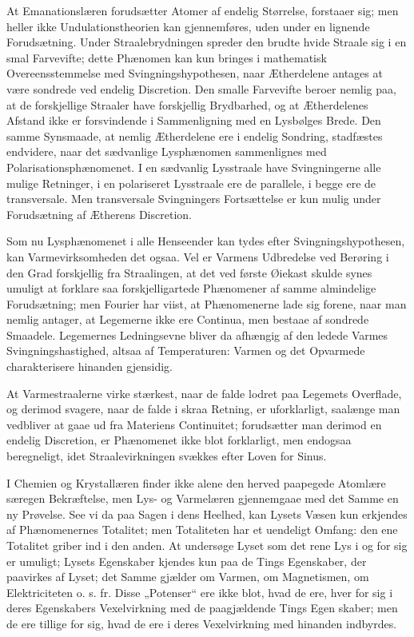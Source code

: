 \documentclass[12pt]{book}
\newcommand{\opage}[1]{\marginnote{\footnotesize\textit{[#1]}}}
\begin{document}
At Emanationslæren forudsætter Atomer af endelig Størrelse, forstaaer sig; men heller
ikke Undulationstheorien kan gjennemføres, uden under en lignende Forudsætning. Under
Straalebrydningen spreder den brudte hvide Straale sig i en smal Farvevifte; dette
Phænomen kan kun bringes i mathematisk Overeensstemmelse med Svingningshypothesen, naar
Ætherdelene antages at være sondrede ved endelig Discretion. Den smalle Farvevifte
beroer nemlig paa, at de forskjellige Straaler have forskjellig Brydbarhed, og at
Ætherdelenes Afstand ikke er forsvindende i Sammenligning med en Lysbølges Brede. Den
samme Synsmaade, at nemlig Ætherdelene ere i endelig Sondring, stadfæstes endvidere,
naar det sædvanlige Lysphænomen sammenlignes med Polarisationsphænomenet. I en
sædvanlig Lysstraale have
\opage{65} Svingningerne alle mulige Retninger, i en polariseret Lysstraale ere de parallele, i
begge ere de transversale. Men transversale Svingningers Fortsættelse er kun mulig
under Forudsætning af Ætherens Discretion.

Som nu Lysphænomenet i alle Henseender kan tydes efter Svingningshypothesen, kan
Varmevirksomheden det ogsaa. Vel er Varmens Udbredelse ved Berøring i den Grad
forskjellig fra Straalingen, at det ved første Øiekast skulde synes umuligt at forklare
saa forskjelligartede Phænomener af samme almindelige Forudsætning; men Fourier har
viist, at Phænomenerne lade sig forene, naar man nemlig antager, at Legemerne ikke ere
Continua, men bestaae af sondrede Smaadele. Legemernes Ledningsevne bliver da afhængig
af den ledede Varmes Svingningshastighed, altsaa af Temperaturen: Varmen og det
Opvarmede charakterisere hinanden gjensidig.

At Varmestraalerne virke stærkest, naar de falde lodret paa Legemets Overflade, og
derimod svagere, naar de falde i skraa Retning, er uforklarligt, saalænge man vedbliver
at gaae ud fra Materiens Continuitet; forudsætter man derimod en endelig Discretion, er
Phænomenet ikke blot forklarligt, men endogsaa beregneligt, idet Straalevirkningen
svækkes efter Loven for Sinus.

I Chemien og Krystallæren finder ikke alene den herved paapegede Atomlære særegen
Bekræftelse, men Lys- og Varmelæren gjennemgaae med det Samme en ny Prøvelse. See vi da
paa Sagen i dens Heelhed, kan Lysets Væsen kun erkjendes af Phænomenernes Totalitet;
men Totaliteten har et uendeligt Omfang: den ene Totalitet griber ind i den anden. At
undersøge Lyset som det rene Lys i og for sig er umuligt; Lysets Egenskaber kjendes kun
paa de Tings Egenskaber, der paavirkes af Lyset; det Samme gjælder om Varmen, om
Magnetismen, om Elektriciteten o. s. fr. Disse „Potenser“ ere ikke blot, hvad de ere,
hver for sig i deres Egenskabers Vexelvirkning med de paagjældende Tings Egen%
\opage{66}skaber; men de ere tillige for sig, hvad de ere i deres Vexelvirkning med hinanden
indbyrdes.
\end{document}
